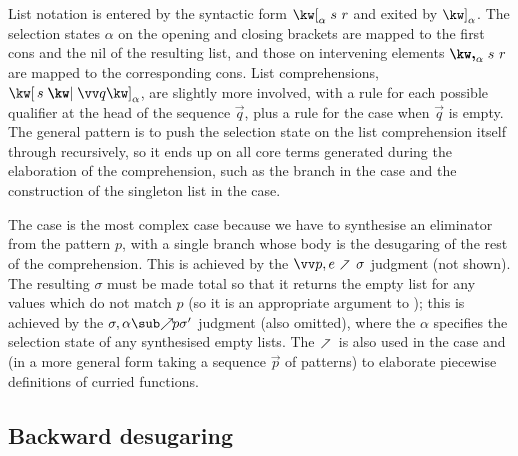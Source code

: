 List notation is entered by the syntactic form $\annList{s}{r}{\alpha}$ and exited by $\annListEnd{\alpha}$. The selection states $\alpha$ on the opening and closing brackets are mapped to the first cons and the nil of the resulting list, and those on intervening elements $\annListNext{s}{r}{\alpha}$ are mapped to the corresponding cons. List comprehensions, $\annListComp{s}{\vec{q}}{\alpha}$, are slightly more involved, with a rule for each possible qualifier at the head of the sequence $\vec{q}$, plus a rule for the case when $\vec{q}$ is empty. The general pattern is to push the selection state on the list comprehension itself through recursively, so it ends up on all core terms generated during the elaboration of the comprehension, such as the  branch in the  case and the construction of the singleton list in the  case.

The  case is the most complex case because we have to synthesise an eliminator from the pattern $p$, with a single branch whose body is the desugaring of the rest of the comprehension. This is achieved by the $\vec{p}, e \clauseFwdR \sigma$ judgment (not shown). The resulting $\sigma$ must be made total so that it returns the empty list for any values which do not match $p$ (so it is an appropriate argument to ); this is achieved by the $\totaliseFwd{\sigma}{\alpha}{p}{\sigma'}$ judgment (also omitted), where the $\alpha$ specifies the selection state of any synthesised empty lists. The $\clauseFwdR$ is also used in the  case and (in a more general form taking a sequence $\vec{p}$ of patterns) to elaborate piecewise definitions of curried functions.

\subsection{Backward desugaring}

